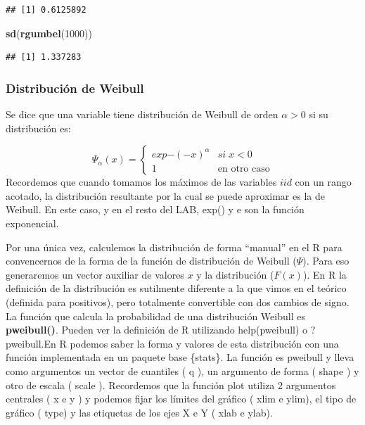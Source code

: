 \documentclass[
  oneside]{book}
\newenvironment{Shaded}{\begin{snugshade}}{\end{snugshade}}
\newcommand{\DecValTok}[1]{\textcolor[rgb]{0.00,0.00,0.81}{#1}}
\newcommand{\FunctionTok}[1]{\textcolor[rgb]{0.13,0.29,0.53}{\textbf{#1}}}
\newcommand{\NormalTok}[1]{#1}
\begin{document}
\begin{verbatim}
## [1] 0.6125892
\end{verbatim}

\begin{Shaded}
\begin{Highlighting}[]
\FunctionTok{sd}\NormalTok{(}\FunctionTok{rgumbel}\NormalTok{(}\DecValTok{1000}\NormalTok{))}
\end{Highlighting}
\end{Shaded}

\begin{verbatim}
## [1] 1.337283
\end{verbatim}

\hypertarget{distribuciuxf3n-de-weibull}{%
\subsubsection{Distribución de
Weibull}\label{distribuciuxf3n-de-weibull}}

Se dice que una variable tiene distribución de Weibull de orden
\(\alpha>0\) si su distribución es:

\[\Psi_{\alpha}(x)=\begin{cases}
exp{-(-x)^{\alpha}} & si\;x<0\\
1 & \text{en otro caso}
\end{cases}\] Recordemos que cuando tomamos los máximos de las variables
\(iid\) con un rango acotado, la distribución resultante por la cual se
puede aproximar es la de Weibull. En este caso, y en el resto del LAB,
exp() y e son la función exponencial.

Por una única vez, calculemos la distribución de forma ``manual'' en el
R para convencernos de la forma de la función de distribución de Weibull
(\(\Psi\)). Para eso generaremos un vector auxiliar de valores \(x\) y
la distribución (\(F(x)\)). En R la definición de la distribución es
sutilmente diferente a la que vimos en el teórico (definida para
positivos), pero totalmente convertible con dos cambios de signo. La
función que calcula la probabilidad de una distribución Weibull es
\textbf{pweibull()}. Pueden ver la definición de R utilizando
help(pweibull) o ?pweibull.En R podemos saber la forma y valores de esta
distribución con una función implementada en un paquete base \{stats\}.
La función es pweibull y lleva como argumentos un vector de cuantiles (
q ), un argumento de forma ( shape ) y otro de escala ( scale ).
Recordemos que la función plot utiliza 2 argumentos centrales ( x e y )
y podemos fijar los límites del gráfico ( xlim e ylim), el tipo de
gráfico ( type) y las etiquetas de los ejes X e Y ( xlab e ylab).
\end{document}
